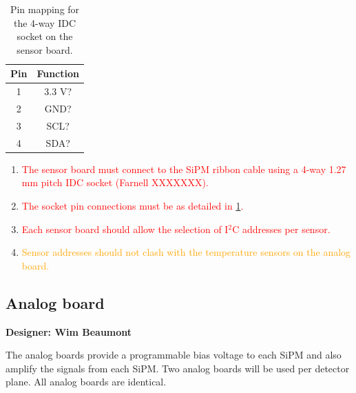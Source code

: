 \documentclass[a4paper]{article}
\newcommand{\must}[1]{\textcolor{red}{#1}}
\newcommand{\should}[1]{\textcolor{orange}{#1}}
\def\I2C{I$^2$C}
\begin{document}
\begin{table}[h]
    \begin{center}
        \caption{Pin mapping for the 4-way IDC socket on the sensor board.}
        \label{tab:IDC4waySensor}
        \begin{tabular}{cc}
            \hline
            \hline
            Pin & Function \\
            \hline
            1 & 3.3 V? \\
            2 & GND? \\
            3 & SCL? \\
            4 & SDA? \\
            \hline
            \hline
        \end{tabular}
    \end{center}
\end{table}

\begin{enumerate}
    \item \must{The sensor board must connect to the SiPM ribbon cable using a 4-way 1.27 mm pitch IDC socket (Farnell XXXXXXX).}
    \item \must{The socket pin connections must be as detailed in \cref{tab:IDC4waySensor}.}
    \item \must{Each sensor board should allow the selection of \I2C addresses per sensor.}
    \item \should{Sensor addresses should not clash with the temperature sensors on the analog board.}
\end{enumerate}

\clearpage
\newpage
\subsection{Analog board}

{\bf Designer: Wim Beaumont}

The analog boards provide a programmable bias voltage to each SiPM and also amplify the signals from each SiPM.
Two analog boards will be used per detector plane.
All analog boards are identical.
\end{document}
